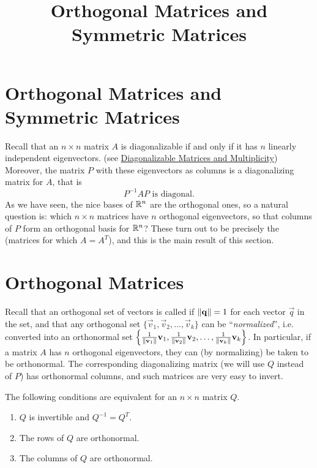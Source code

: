 \documentclass{ximera}
\title{Orthogonal Matrices and Symmetric Matrices} \license{CC BY-NC-SA 4.0}
\begin{document}
\begin{abstract}

\end{abstract}
\maketitle

\section*{Orthogonal Matrices and Symmetric Matrices}
Recall that an $n \times n$ matrix $A$ is diagonalizable if and only if it has $n$ linearly independent eigenvectors.  (see \href{\xmbaseurl/EIG-0050/main}{Diagonalizable Matrices and Multiplicity}) Moreover, the matrix $P$ with these eigenvectors as columns is a diagonalizing matrix for $A$, that is
\begin{equation*}
P^{-1}AP \mbox{ is diagonal.}
\end{equation*}
As we have seen, the nice bases of $\mathbb{R}^n$ are the orthogonal ones, so a natural question is: which $n \times n$ matrices have $n$ orthogonal eigenvectors, so that columns of $P$ form an orthogonal basis for $\mathbb{R}^n$? These turn out to be precisely the  (matrices for which $A=A^T$), and this is the main result of this section.

\section*{Orthogonal Matrices}
Recall that an orthogonal set of vectors is called  if $\left\lVert\mathbf{q}\right\rVert = 1$ for each vector $\vec{q}$ in the set, and that any orthogonal set $\{\vec{v}_{1}, \vec{v}_{2}, \dots, \vec{v}_{k}\}$ can be ``\textit{normalized}'', i.e. converted into an orthonormal set $\left\{ \frac{1}{\left\lVert\mathbf{v}_{1}\right\rVert}\mathbf{v}_{1}, \frac{1}{\left\lVert\mathbf{v}_{2}\right\rVert}\mathbf{v}_{2}, \dots, \frac{1}{\left\lVert\mathbf{v}_{k}\right\rVert}\mathbf{v}_{k} \right\}$. In particular, if a matrix $A$ has $n$ orthogonal eigenvectors, they can (by normalizing) be taken to be orthonormal. The corresponding diagonalizing matrix (we will use $Q$ instead of $P$) has orthonormal columns, and such matrices are very easy to invert.


\begin{theorem}\label{th:orthogonal_matrices}
The following conditions are equivalent for an $n \times n$ matrix $Q$.

\begin{enumerate}
\item\label{th:orthogonal_matrices_a} $Q$ is invertible and $Q^{-1} = Q^{T}$.

\item\label{th:orthogonal_matrices_b} The rows of $Q$ are orthonormal.

\item\label{th:orthogonal_matrices_c} The columns of $Q$ are orthonormal.

\end{enumerate}
\end{theorem}
\end{document}
